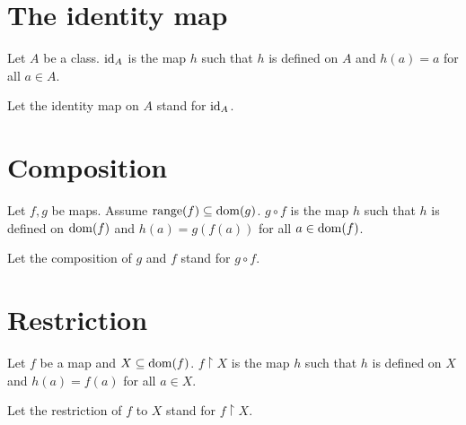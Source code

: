 \documentclass[../../set-theory/set-theory.tex]{subfiles}
\begin{document}
  \section{The identity map}

  \begin{forthel}
    \begin{definition}
      Let $A$ be a class.
      $\operatorname{id}_{A}$ is the map $h$ such that $h$ is defined on $A$ and $h(a) = a$
      for all $a \in A$.
    \end{definition}

    Let the identity map on $A$ stand for $\operatorname{id}_{A}$.
  \end{forthel}


  \section{Composition}

  \begin{forthel}
    \begin{definition}
      Let $f, g$ be maps.
      Assume $\operatorname{range}(f) \subseteq \operatorname{dom}(g)$.
      $g \circ f$ is the map $h$ such that $h$ is defined on $\operatorname{dom}(f)$ and
      $h(a) = g(f(a))$ for all $a \in \operatorname{dom}(f)$.
    \end{definition}

    Let the composition of $g$ and $f$ stand for $g \circ f$.
  \end{forthel}


  \section{Restriction}

  \begin{forthel}
    \begin{definition}
      Let $f$ be a map and $X \subseteq \operatorname{dom}(f)$.
      $f \restriction X$ is the map $h$ such that $h$ is defined on $X$ and
      $h(a) = f(a)$ for all $a \in X$.
    \end{definition}

    Let the restriction of $f$ to $X$ stand for $f \restriction X$.
  \end{forthel}
\end{document}
